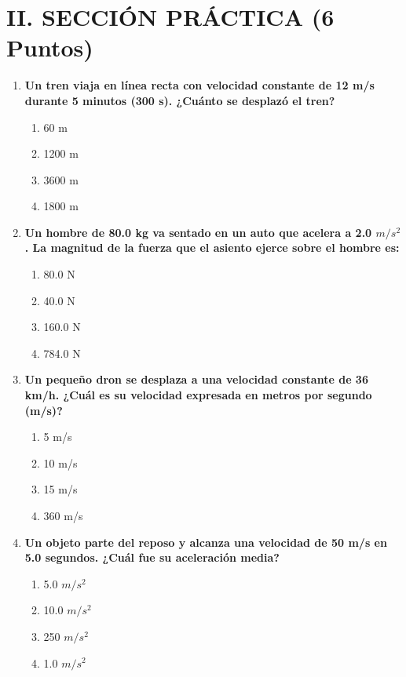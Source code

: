 \documentclass[12pt]{article}
\begin{document}
\section*{II. SECCIÓN PRÁCTICA (6 Puntos)}

\begin{enumerate}[label=\arabic*.]
    \item \textbf{Un tren viaja en línea recta con velocidad constante de 12 m/s durante 5 minutos (300 s). ¿Cuánto se desplazó el tren?}
    \begin{enumerate}[label=\alph*)]
        \item 60 m
        \item 1200 m
        \item 3600 m
        \item 1800 m
    \end{enumerate}

    \item \textbf{Un hombre de 80.0 kg va sentado en un auto que acelera a 2.0 $m/s^2$. La magnitud de la fuerza que el asiento ejerce sobre el hombre es:}
    \begin{enumerate}[label=\alph*)]
        \item 80.0 N
        \item 40.0 N
        \item 160.0 N
        \item 784.0 N
    \end{enumerate}

    \item \textbf{Un pequeño dron se desplaza a una velocidad constante de 36 km/h. ¿Cuál es su velocidad expresada en metros por segundo (m/s)?}
    \begin{enumerate}[label=\alph*)]
        \item 5 m/s
        \item 10 m/s
        \item 15 m/s
        \item 360 m/s
    \end{enumerate}

    \item \textbf{Un objeto parte del reposo y alcanza una velocidad de 50 m/s en 5.0 segundos. ¿Cuál fue su aceleración media?}
    \begin{enumerate}[label=\alph*)]
        \item 5.0 $m/s^2$
        \item 10.0 $m/s^2$
        \item 250 $m/s^2$
        \item 1.0 $m/s^2$
    \end{enumerate}
\end{enumerate}
\end{document}
